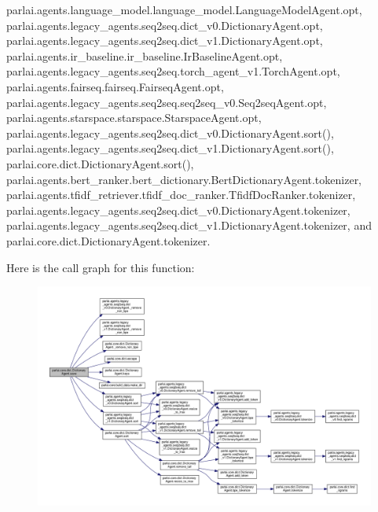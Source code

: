 parlai.\+agents.\+language\+\_\+model.\+language\+\_\+model.\+Language\+Model\+Agent.\+opt, parlai.\+agents.\+legacy\+\_\+agents.\+seq2seq.\+dict\+\_\+v0.\+Dictionary\+Agent.\+opt, parlai.\+agents.\+legacy\+\_\+agents.\+seq2seq.\+dict\+\_\+v1.\+Dictionary\+Agent.\+opt, parlai.\+agents.\+ir\+\_\+baseline.\+ir\+\_\+baseline.\+Ir\+Baseline\+Agent.\+opt, parlai.\+agents.\+legacy\+\_\+agents.\+seq2seq.\+torch\+\_\+agent\+\_\+v1.\+Torch\+Agent.\+opt, parlai.\+agents.\+fairseq.\+fairseq.\+Fairseq\+Agent.\+opt, parlai.\+agents.\+legacy\+\_\+agents.\+seq2seq.\+seq2seq\+\_\+v0.\+Seq2seq\+Agent.\+opt, parlai.\+agents.\+starspace.\+starspace.\+Starspace\+Agent.\+opt, parlai.\+agents.\+legacy\+\_\+agents.\+seq2seq.\+dict\+\_\+v0.\+Dictionary\+Agent.\+sort(), parlai.\+agents.\+legacy\+\_\+agents.\+seq2seq.\+dict\+\_\+v1.\+Dictionary\+Agent.\+sort(), parlai.\+core.\+dict.\+Dictionary\+Agent.\+sort(), parlai.\+agents.\+bert\+\_\+ranker.\+bert\+\_\+dictionary.\+Bert\+Dictionary\+Agent.\+tokenizer, parlai.\+agents.\+tfidf\+\_\+retriever.\+tfidf\+\_\+doc\+\_\+ranker.\+Tfidf\+Doc\+Ranker.\+tokenizer, parlai.\+agents.\+legacy\+\_\+agents.\+seq2seq.\+dict\+\_\+v0.\+Dictionary\+Agent.\+tokenizer, parlai.\+agents.\+legacy\+\_\+agents.\+seq2seq.\+dict\+\_\+v1.\+Dictionary\+Agent.\+tokenizer, and parlai.\+core.\+dict.\+Dictionary\+Agent.\+tokenizer.

Here is the call graph for this function\+:
\nopagebreak
\begin{figure}[H]
\begin{center}
\leavevmode
\includegraphics[width=350pt]{classparlai_1_1core_1_1dict_1_1DictionaryAgent_a0c6a8d8b67fe978549b328e7b7b07450_cgraph}
\end{center}
\end{figure}
\mbox{\label{classparlai_1_1core_1_1dict_1_1DictionaryAgent_a3d8996e367685451f7de85e8284243d7}} 
